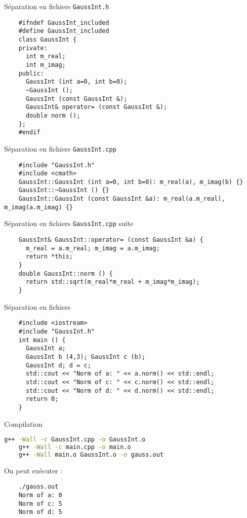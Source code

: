 \begin{frame}[fragile]{Séparation en fichiers}
  \texttt{GaussInt.h}
  \begin{lstlisting}
    #ifndef GaussInt_included
    #define GaussInt_included
    class GaussInt {
    private:
      int m_real;
      int m_imag;
    public:
      GaussInt (int a=0, int b=0);
      ~GaussInt ();
      GaussInt (const GaussInt &);
      GaussInt& operator= (const GaussInt &);
      double norm ();
    };
    #endif
  \end{lstlisting}
\end{frame}

\begin{frame}[fragile]{Séparation en fichiers}
  \texttt{GaussInt.cpp}
  \begin{lstlisting}
    #include "GaussInt.h"
    #include <cmath>
    GaussInt::GaussInt (int a=0, int b=0): m_real(a), m_imag(b) {}
    GaussInt::~GaussInt () {}
    GaussInt::GaussInt (const GaussInt &a): m_real(a.m_real), m_imag(a.m_imag) {}
  \end{lstlisting}
\end{frame}

\begin{frame}[fragile]{Séparation en fichiers}
  \texttt{GaussInt.cpp} suite
  \begin{lstlisting}
    GaussInt& GaussInt::operator= (const GaussInt &a) {
      m_real = a.m_real; m_imag = a.m_imag;
      return *this;
    }
    double GaussInt::norm () {
      return std::sqrt(m_real*m_real + m_imag*m_imag);
    }
  \end{lstlisting}
\end{frame}

\begin{frame}[fragile]{Séparation en fichiers}
  \begin{lstlisting}
    #include <iostream>
    #include "GaussInt.h"
    int main () {
      GaussInt a;
      GaussInt b (4,3); GaussInt c (b);
      GaussInt d; d = c;
      std::cout << "Norm of a: " << a.norm() << std::endl;
      std::cout << "Norm of c: " << c.norm() << std::endl;
      std::cout << "Norm of d: " << d.norm() << std::endl;
      return 0;
    }
  \end{lstlisting}
\end{frame}

\begin{frame}[fragile]{Compilation}
  \begin{lstlisting}[language=bash]
    g++ -Wall -c GaussInt.cpp -o GaussInt.o
    g++ -Wall -c main.cpp -o main.o
    g++ -Wall main.o GaussInt.o -o gauss.out
  \end{lstlisting}

  On peut exécuter :
  \begin{lstlisting}
    ./gauss.out
    Norm of a: 0
    Norm of c: 5
    Norm of d: 5
  \end{lstlisting}
\end{frame}

